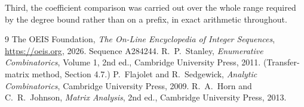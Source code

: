\documentclass[11pt,a4paper]{article}
\theoremstyle{plain}
\theoremstyle{definition}
\begin{document}
Third, the coefficient comparison was carried out over the whole range required by the degree
bound rather than on a prefix, in exact arithmetic throughout.

\begin{thebibliography}{9}
 The OEIS Foundation, \emph{The On-Line Encyclopedia of Integer
Sequences}, \url{https://oeis.org}, 2026. Sequence A284244.
 R.~P.~Stanley, \emph{Enumerative Combinatorics}, Volume 1, 2nd ed.,
Cambridge University Press, 2011. (Transfer-matrix method, Section 4.7.)
 P.~Flajolet and R.~Sedgewick, \emph{Analytic Combinatorics}, Cambridge
University Press, 2009.
 R.~A.~Horn and C.~R.~Johnson, \emph{Matrix Analysis}, 2nd ed., Cambridge
University Press, 2013.
\end{thebibliography}
\end{document}
